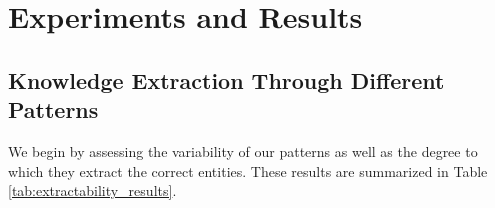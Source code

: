 \section{Experiments and Results}
\label{sec:experiments}


% 



\subsection{Knowledge Extraction Through Different Patterns}




We begin by assessing the variability of our patterns as
well as the degree to which they extract the correct
entities. These results are summarized in Table
\ref{tab:extractability_results}.

